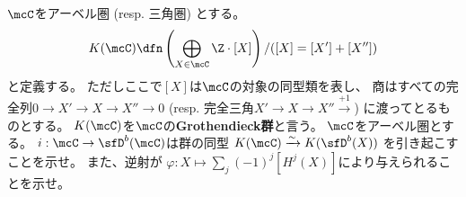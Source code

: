 \documentclass[uplatex,dvipdfmx]{jsarticle}
\begin{document}
\maketitle\HeaderCommentA
\section{}
\fi



\begin{prob}\label{1.27}
  \(\mcC\)をアーベル圏 (resp. 三角圏) とする。
  \[K(\mcC)\dfn \left(\bigoplus_{X\in \mcC} \Z\cdot [X]\right)/([X]=[X']+[X''])\]
  と定義する。
  ただしここで\([X]\)は\(\mcC\)の対象の同型類を表し、
  商はすべての完全列\(0\to X'\to X\to X''\to 0\)
  (resp. 完全三角\(X'\to X \to X'' \xrightarrow{+1}\))
  に渡ってとるものとする。
  \(K(\mcC)\)を\(\mcC\)の\textbf{Grothendieck群}と言う。
  \(\mcC\)をアーベル圏とする。
  \(i:\mcC \to \sfD^b(\mcC)\)は群の同型
  \(K(\mcC) \xrightarrow{\sim} K(\sfD^b(X))\)
  を引き起こすことを示せ。
  また、逆射が
  \(\varphi:X\mapsto \sum_j(-1)^j[H^j(X)]\)により与えられることを示せ。
\end{prob}
\end{document}

